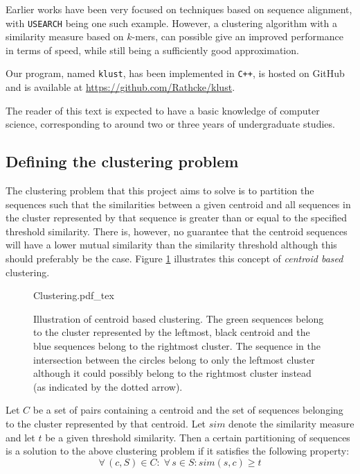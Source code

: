 Earlier works have been very focused on techniques based on sequence alignment,
with \texttt{USEARCH} being one such example. However, a clustering algorithm
with a similarity measure based on $k$-mers, can possible give an improved
performance in terms of speed, while still being a sufficiently good
approximation.

Our program, named \texttt{klust}, has been implemented in \texttt{C++}, is
hosted on GitHub and is available at \url{https://github.com/Rathcke/klust}.

The reader of this text is expected to have a basic knowledge of computer
science, corresponding to around two or three years of undergraduate studies.


\subsection{Defining the clustering problem}

The clustering problem that this project aims to solve is to partition
the sequences such that the similarities between a given centroid and all
sequences in the cluster represented by that sequence is greater than or equal
to the specified threshold similarity. There is, however, no guarantee that
the centroid sequences will have a lower mutual similarity than the similarity
threshold although this should preferably be the case. Figure
\ref{fig:clustering_concept} illustrates this concept of \emph{centroid based}
clustering.

\begin{figure}[h!]
  \centering
  \def\svgwidth{0.9\columnwidth}
  {Clustering.pdf_tex}
  \caption{Illustration of centroid based clustering. The green sequences
    belong to the cluster represented by the leftmost, black centroid and the
    blue sequences belong to the rightmost cluster. The sequence in the
    intersection between the circles belong to only the leftmost cluster although
    it could possibly belong to the rightmost cluster instead (as indicated by
    the dotted arrow).}
  \label{fig:clustering_concept}
\end{figure}

Let $C$ be a set of pairs containing a centroid and the set of sequences
belonging to the cluster represented by that centroid. Let $sim$ denote the
similarity measure and let $t$ be a given threshold similarity. Then a certain
partitioning of sequences is a solution to the above clustering problem if it
satisfies the following property: \[   \forall\, (c,S) \in C:\; \forall\, s
\in S: sim(s,c) \geq t \]
